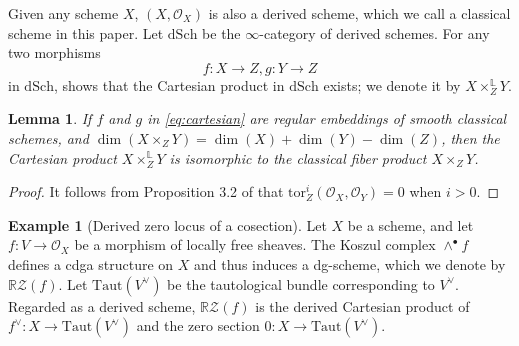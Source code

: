 \documentclass{amsart}
\numberwithin{equation}{section}
\newcommand\mc{\mathcal}
\newcommand\mb{\mathbb}
\newtheorem{lemma}[theorem]{Lemma}
\theoremstyle{definition}
\newtheorem{example}[theorem]{Example}
\theoremstyle{remark}
\begin{document}
Given any scheme $X$, $(X,\mc{O}_{X})$ is also a derived scheme, which we call a classical scheme in this paper. Let $\mathrm{dSch}$ be the $\infty$-category of derived schemes. For any two morphisms 
  \begin{equation}
    \label{eq:cartesian}
    f:X\to Z, g:Y\to Z
  \end{equation}
in $\mathrm{dSch}$, \cite{toen2008homotopical} shows that the Cartesian product in $\mathrm{dSch}$ exists; we denote it by $X\times_{Z}^{\mb{L}}Y$.
\begin{lemma}
  \label{n610}
  If $f$ and $g$ in \cref{eq:cartesian} are regular embeddings of smooth classical schemes, and $\dim(X\times_{Z}Y)=\dim(X)+\dim(Y)-\dim(Z)$, then the Cartesian product $X\times_{Z}^{\mb{L}}Y$ is isomorphic to the classical fiber product $X\times_{Z}Y$.
\end{lemma}
\begin{proof}
  It follows from Proposition 3.2 of \cite{neguct2018hecke} that $\mathrm{tor}^{i}_{Z}(\mc{O}_{X},\mc{O}_{Y})=0$ when $i>0$.
\end{proof}

\begin{example}[Derived zero locus of a cosection]
  Let $X$ be a scheme, and let $f:V\to \mc{O}_X$ be a morphism of locally free sheaves. The Koszul complex $\wedge^{\bullet}f$ defines a cdga structure on $X$ and thus induces a dg-scheme, which we denote by $\mb{R}\mc{Z}(f)$. Let $\mathrm{Taut}(V^{\vee})$ be the tautological bundle corresponding to $V^{\vee}$. Regarded as a derived scheme, $\mb{R}\mc{Z}(f)$ is the derived Cartesian product of $f^{\vee}:X\to \mathrm{Taut}(V^{\vee})$ and the zero section $0:X\to \mathrm{Taut}(V^{\vee})$.
\end{example}
\end{document}

